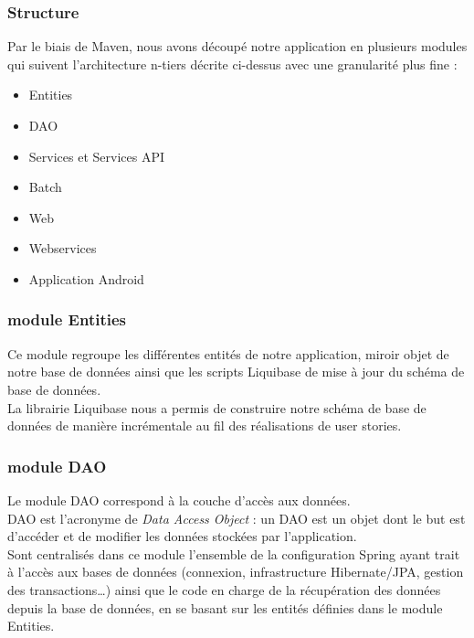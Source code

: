 \subsubsection{Structure}
Par le biais de Maven, nous avons découpé notre application en plusieurs modules qui suivent l'architecture n-tiers décrite ci-dessus avec une granularité plus fine :

\begin{itemize}
	\item Entities
	\item DAO
	\item Services et Services API
	\item Batch
	\item Web
	\item Webservices
	\item Application Android
\end{itemize}

\subsubsection*{module Entities}

Ce module regroupe les différentes entités de notre application, miroir objet de notre base de données ainsi que les scripts Liquibase de mise à jour du schéma de base de données.\\
La librairie Liquibase nous a permis de construire notre schéma de base de données de manière incrémentale  au fil des réalisations de user stories.\\

\subsubsection*{module DAO}

Le module DAO correspond à la couche d'accès aux données.\\
DAO est l'acronyme de \textit{Data Access Object} : un DAO est un objet dont le but est d'accéder et de modifier les données stockées par l'application.\\ 

Sont centralisés dans ce module l'ensemble de la configuration Spring ayant trait à l'accès aux bases de données (connexion, infrastructure Hibernate/JPA, gestion des transactions\ldots) ainsi que le code en charge de la récupération des données depuis la base de données, en se basant sur les entités définies dans le module Entities.\\

